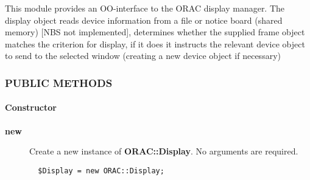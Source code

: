 This module provides an OO-interface to the ORAC display manager.  The
display object reads device information from a file or notice board
(shared memory) [NBS not implemented], determines whether the supplied
frame object matches the criterion for display, if it does it
instructs the relevant device object to send to the selected window
(creating a new device object if necessary)

\subsubsection*{PUBLIC METHODS\label{ORAC::Display_PUBLIC_METHODS}}
\paragraph*{Constructor\label{ORAC::Display_Constructor}}
\begin{description}

\item[{\textbf{new}}] \mbox{}

Create a new instance of \textbf{ORAC::Display}. No arguments are
required.

\begin{verbatim}
  $Display = new ORAC::Display;
\end{verbatim}
\end{description}
